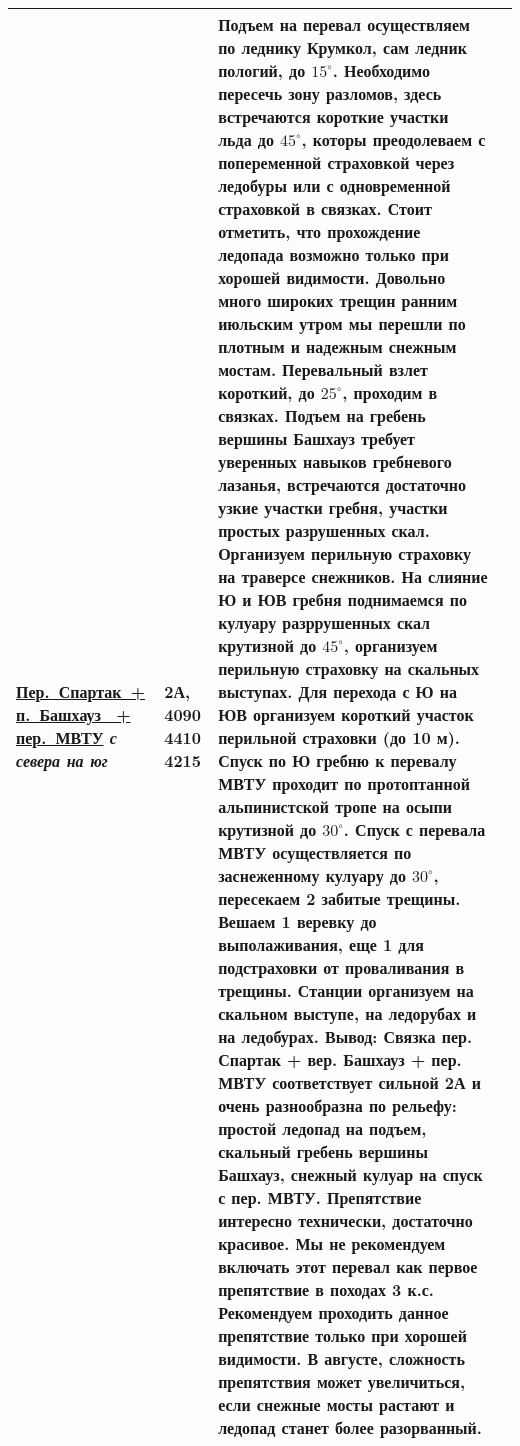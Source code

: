 \begin{longtable}{|>{\centering\arraybackslash}m{4.5cm}|>{\centering\arraybackslash}m{1.8cm}|>{\raggedright\arraybackslash}m{9.6cm}|>{\centering\arraybackslash}m{1.2cm}|}
			\hyperref[subsec:Day6]{{\small Пер.~Спартак~+ п.~Башхауз~ + пер.~МВТУ}}										\newline\textit{с севера на юг}			&	2А, 4090 4410 4215			&	{\small Подъем на перевал осуществляем по леднику Крумкол, сам ледник пологий, до $15^\circ$. Необходимо пересечь зону разломов, здесь встречаются короткие участки льда до $45^\circ$, которы преодолеваем с попеременной страховкой через ледобуры или с одновременной страховкой в связках. Стоит отметить, что прохождение ледопада возможно только при хорошей видимости. Довольно много широких трещин ранним июльским утром мы перешли по плотным и надежным снежным мостам. Перевальный взлет короткий, до $25^\circ$, проходим в связках. Подъем на гребень вершины Башхауз требует уверенных навыков гребневого лазанья, встречаются достаточно узкие участки гребня, участки простых разрушенных скал. Организуем перильную страховку на траверсе снежников. На слияние Ю и ЮВ гребня поднимаемся по кулуару разррушенных скал крутизной до $45^\circ$, организуем перильную страховку на скальных выступах. Для перехода с Ю на ЮВ организуем короткий участок перильной страховки (до 10 м). Спуск по Ю гребню к перевалу МВТУ проходит по протоптанной альпинистской тропе на осыпи крутизной до $30^\circ$. Спуск с перевала МВТУ осуществляется по заснеженному кулуару до $30^\circ$, пересекаем 2 забитые трещины. Вешаем 1 веревку до выполаживания, еще 1 для подстраховки от проваливания в трещины. Станции организуем на скальном выступе, на ледорубах и на ледобурах. \newline \textbf{Вывод:} Связка пер. Спартак + вер. Башхауз + пер. МВТУ соответствует сильной 2А и очень разнообразна по рельефу: простой ледопад на подъем, скальный гребень вершины Башхауз, снежный кулуар на спуск с пер. МВТУ. Препятствие интересно технически, достаточно красивое. Мы не рекомендуем включать этот перевал как первое препятствие в походах 3 к.с. Рекомендуем проходить данное препятствие только при хорошей видимости. В августе, сложность препятствия может увеличиться, если снежные мосты растают и ледопад станет более разорванный.}	&			\\ \hline

\end{longtable}
